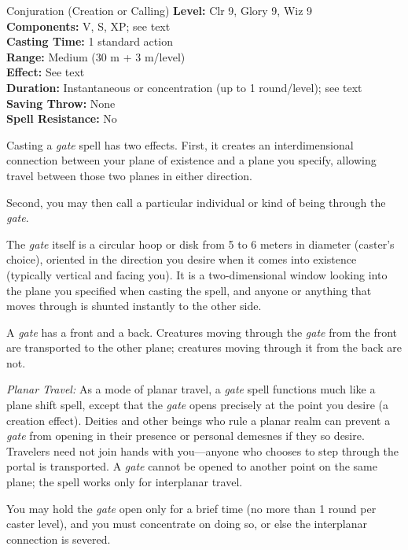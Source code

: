 {Conjuration (Creation or Calling)}
{
	\textbf{Level:}
	Clr 9, Glory 9, Wiz 9\\
	\textbf{Components:}
	V, S, XP; see text\\
	\textbf{Casting Time:}
	1 standard action\\
	\textbf{Range:}
	Medium (30 m + 3 m/level)\\
	\textbf{Effect:}
	See text\\
	\textbf{Duration:}
	Instantaneous or concentration (up to 1 round/level); see text\\
	\textbf{Saving Throw:}
	None\\
	\textbf{Spell Resistance:}
	No\\
}
{
	Casting a \emph{gate} spell has two effects. First, it creates an interdimensional connection between your plane of existence and a plane you specify, allowing travel between those two planes in either direction.

	Second, you may then call a particular individual or kind of being through the \emph{gate}.

	The \emph{gate} itself is a circular hoop or disk from 5 to 6 meters in diameter (caster's choice), oriented in the direction you desire when it comes into existence (typically vertical and facing you). It is a two-dimensional window looking into the plane you specified when casting the spell, and anyone or anything that moves through is shunted instantly to the other side.

	A \emph{gate} has a front and a back. Creatures moving through the \emph{gate} from the front are transported to the other plane; creatures moving through it from the back are not.

	\textit{Planar Travel:}
	As a mode of planar travel, a \emph{gate} spell functions much like a plane shift spell, except that the \emph{gate} opens precisely at the point you desire (a creation effect). Deities and other beings who rule a planar realm can prevent a \emph{gate} from opening in their presence or personal demesnes if they so desire. Travelers need not join hands with you---anyone who chooses to step through the portal is transported. A \emph{gate} cannot be opened to another point on the same plane; the spell works only for interplanar travel.

	You may hold the \emph{gate} open only for a brief time (no more than 1 round per caster level), and you must concentrate on doing so, or else the interplanar connection is severed.

}
